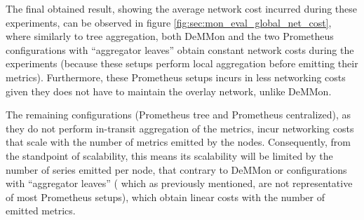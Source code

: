 The final obtained result, showing the average network cost incurred during these experiments, can be observed in figure \ref{fig:sec:mon_eval_global_net_cost}, where similarly to tree aggregation, both DeMMon and the two Prometheus configurations with ``aggregator leaves'' obtain constant network costs during the experiments (because these setups perform local aggregation before emitting their metrics). Furthermore, these Prometheus setups incurs in less networking costs given they does not have to maintain the overlay network, unlike DeMMon. 

The remaining configurations (Prometheus tree and Prometheus centralized), as they do not perform in-transit aggregation of the metrics, incur networking costs that scale with the number of metrics emitted by the nodes. Consequently, from the standpoint of scalability, this means its scalability will be limited by the number of series emitted per node, that  contrary to DeMMon or configurations with ``aggregator leaves'' ( which as previously mentioned, are not representative of most Prometheus setups), which obtain linear costs with the number of emitted metrics.


